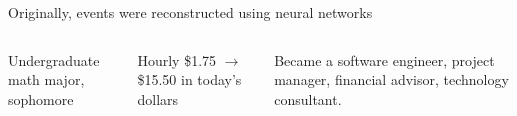 \documentclass[aspectratio=169]{beamer}
\begin{document}
\begin{frame}{Originally, events were reconstructed using neural networks}
\begin{columns}
\begin{minipage}{\linewidth}
\tiny
\vspace{0.2 cm}
Undergraduate math major, sophomore

\vspace{0.2 cm}
Hourly \$1.75 $\to$ \$15.50 in today's dollars

\vspace{0.2 cm}
Became a software engineer, project manager, financial advisor, technology consultant.
\end{minipage}

\end{columns}
\end{frame}
\end{document}
